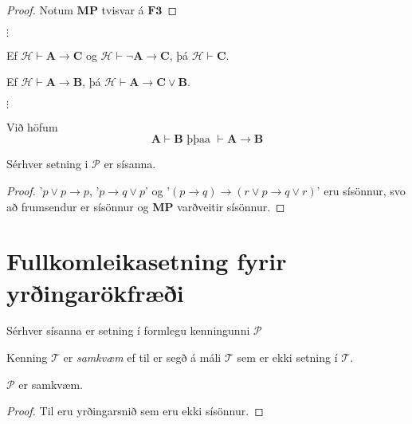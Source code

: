 \documentclass[12pt]{article}
\begin{document}
\begin{proof}
  Notum $\textbf{MP}$ tvisvar á $\textbf{F3}$
\end{proof}

$\vdots$\\


\begin{setn}
  Ef $\mathcal{H} \vdash \textbf{A} \rightarrow \textbf{C}$ og
  $\mathcal{H} \vdash \lnot \textbf{A} \rightarrow \textbf{C}$,
  þá $\mathcal{H} \vdash \textbf{C}$.
\end{setn}

\begin{setn}
    Ef $\mathcal{H} \vdash \textbf{A} \rightarrow \textbf{B}$,
    þá $ \mathcal{H} \vdash \textbf{A} \rightarrow \textbf{C} \vee \textbf{B}$.
\end{setn}


$\vdots$\\

\begin{setn}[Fylgisetning]
  Við höfum
  \[ \mathbf{A} \vdash \mathbf{B} \text{ þþaa } \vdash \mathbf{A} \rightarrow \mathbf{B} \]

\end{setn}

\begin{setn}
  Sérhver setning i $\mathcal{P}$ er sísanna.
  \begin{proof}
    '$p \vee p \rightarrow p$, '$p \rightarrow q \vee p$' og
    '$(p \rightarrow q) \rightarrow (r \vee p \rightarrow q \vee r)$'
    eru sísönnur, svo að frumsendur er sísönnur og \textbf{MP} varðveitir sísönnur.
  \end{proof}
\end{setn}
\section{Fullkomleikasetning fyrir yrðingarökfræði}

Sérhver sísanna er setning í formlegu kenningunni $\mathcal{P}$
\begin{skgr}
  Kenning $\mathcal{T}$ er \emph{samkvæm} ef til er segð á máli $\mathcal{T}$
  sem er ekki setning í $\mathcal{T}$.
\end{skgr}

\begin{setn}
  $\mathcal{P}$ er samkvæm.
    \begin{proof}
      Til eru yrðingarsnið sem eru ekki sísönnur.
    \end{proof}
\end{setn}
\end{document}
